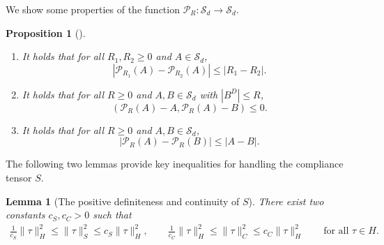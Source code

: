 \documentclass[11pt, a4paper]{article}
\newtheorem{Lem}[Th]{Lemma}
\newtheorem{Prop}[Th]{Proposition}
\newcommand{\Sym}{{\mathcal S}}
\newcommand{\Hs}{{H}}
\newcommand{\Pop}[1]{\mathcal{P}_{#1}}
\begin{document}
We show some properties of the function $\Pop{R}:\Sym_d\rightarrow\Sym_d$.

\begin{Prop}[{\cite[Proposition 5.4]{AM25}}]\label{Prop:Phi}
    \begin{enumerate}
        \item[(i)] It holds that for all $R_1, R_2\ge0$ and $A \in \Sym_d$,
        \[
            |\Pop{R_1}(A) - \Pop{R_2}(A)| \le |R_1 - R_2|.
        \]
        \item[(ii)] It holds that for all $R\ge0$ and $A, B \in \Sym_d$ with $|B^D|\le R$,
        \[
            (\Pop{R}(A) - A, \Pop{R}(A) - B) \le 0.
        \]
        \item[(iii)] It holds that for all $R\ge0$ and $A, B \in \Sym_d$,
        \[
            |\Pop{R}(A) - \Pop{R}(B)| \le |A - B|.
        \]
    \end{enumerate}
\end{Prop}

The following two lemmas provide key inequalities for handling the compliance tensor $S$.

\begin{Lem}[The positive definiteness and continuity of $S$]\label{Lem:posSC}
    There exist two constants $c_S, c_C > 0$ such that 
    \begin{align}\label{ineq:posSC}
        \frac{1}{c_S}\|\tau\|_\Hs^2 \le \|\tau\|_S^2 \le c_S\|\tau\|_\Hs^2,\qquad
        \frac{1}{c_C}\|\tau\|_\Hs^2 \le \|\tau\|_C^2 \le c_C\|\tau\|_\Hs^2
        \qquad\mbox{for all }\tau\in\Hs.
    \end{align}
\end{Lem}
\end{document}
